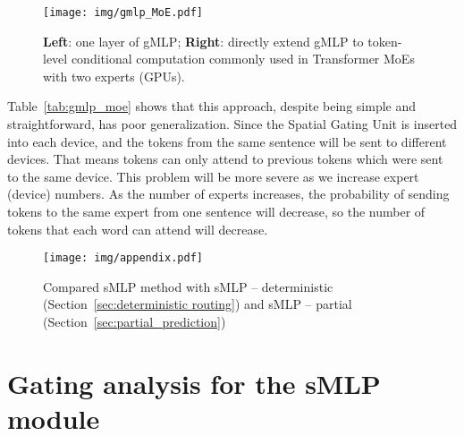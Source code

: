 \documentclass{article}
\begin{document}
\begin{figure}[ht!]
    \centering
    \texttt{[image: img/gmlp\_MoE.pdf]}
    \vspace{-5mm}
    \caption{\textbf{Left}: one layer of gMLP\citep{gmlp}; \textbf{Right}: directly extend gMLP to token-level conditional computation commonly used in Transformer MoEs \citep{gshard,switch,baselayer,hashlayer} with two experts (GPUs).}
    \label{fig:gmlp_moe}
\end{figure}


\begin{table}[ht!]
\centering
{}
    \caption{Extending gMLP to token-based MoEs hurts performance compared to dense gMLP. Furthermore, increasing the number of experts worsens the performance.}\label{tab:gmlp_moe}
\end{table}

Table~\ref{tab:gmlp_moe} shows that this approach, despite being simple and straightforward, has poor generalization. Since the Spatial Gating Unit is inserted into each device, and the tokens from the same sentence will be sent to different devices. That means tokens can only attend to previous tokens which were sent to the same device. This problem will be more severe as we increase expert (device) numbers. As the number of experts increases, the probability of sending tokens to the same expert from one sentence will decrease, so the number of tokens that each word can attend will decrease. 






\begin{figure*}[ht!]
    \centering
    \texttt{[image: img/appendix.pdf]}
    \caption{Compared sMLP method with sMLP -- deterministic (Section~\ref{sec:deterministic routing}) and sMLP -- partial (Section~\ref{sec:partial_prediction})}
    \label{fig:smlp}
\end{figure*}



\section{Gating analysis for the sMLP module}
\label{sec:normal_gating}
\end{document}
